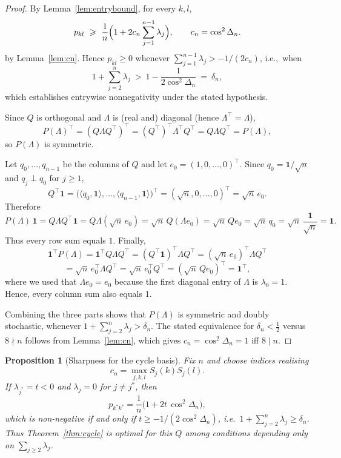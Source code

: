 \documentclass[12pt,fleqn]{amsart}
\renewcommand{\ge}{\geqslant}
\newtheorem{prop}[thm]{Proposition}
\theoremstyle{remark}
\newcommand{\1}{\mathbf{1}}
\begin{document}
\begin{proof}
By Lemma~\ref{lem:entrybound}, for every $k,l$,
\[
p_{kl}\ \ge\ \frac1n\Bigl(1+2c_n\sum_{j=1}^{n-1}\lambda_j\Bigr),
\qquad c_n=\cos^2\Delta_n.
\]
by Lemma~\ref{lem:cn}. Hence $p_{kl}\ge0$ whenever $\sum_{j=1}^{n-1}\lambda_j>-1/(2c_n)$, i.e.,\ when
\[
1+\sum_{j=2}^n\lambda_j\ >\ 1-\frac{1}{2\cos^2\Delta_n}\ =\ \delta_n,
\]
which establishes entrywise nonnegativity under the stated hypothesis.

\smallskip
Since $Q$ is orthogonal and $\Lambda$ is (real and) diagonal (hence $\Lambda^\top=\Lambda$),
\[
P(\Lambda)^\top=(Q\Lambda Q^\top)^\top=(Q^\top)^\top\Lambda^\top Q^\top=Q\Lambda Q^\top=P(\Lambda),
\]
so $P(\Lambda)$ is symmetric.

\smallskip
Let $q_0,\dots,q_{n-1}$ be the columns of $Q$ and let $e_0=(1,0,\dots,0)^\top$. Since $q_0=\1/\sqrt n$ and $q_j\perp q_0$ for $j\ge1$,
\[
Q^\top\1=\big(\langle q_0,\1\rangle,\dots,\langle q_{n-1},\1\rangle\big)^\top=(\sqrt n,0,\dots,0)^\top=\sqrt n\,e_0.
\]
Therefore
\[
P(\Lambda)\,\1
=Q\Lambda Q^\top\1
=Q\Lambda(\sqrt n\,e_0)
=\sqrt n\,Q(\Lambda e_0)
=\sqrt n\,Q e_0
=\sqrt n\,q_0
=\sqrt n\,\frac{\1}{\sqrt n}
=\1.
\]
Thus every row sum equals $1$. Finally,
\[
\1^\top P(\Lambda)
=\1^\top Q\Lambda Q^\top
=(Q^\top\1)^\top \Lambda Q^\top
=(\sqrt n\,e_0)^\top \Lambda Q^\top
\]
\[
=\sqrt n\,e_0^\top \Lambda Q^\top
=\sqrt n\,e_0^\top Q^\top
=(\sqrt n\,Q e_0)^\top
=\1^\top,
\]
where we used that $\Lambda e_0=e_0$ because the first diagonal entry of $\Lambda$ is $\lambda_0=1$. Hence, every column sum also equals $1$.

Combining the three parts shows that $P(\Lambda)$ is symmetric and doubly stochastic, whenever $1+\sum_{j=2}^n\lambda_j>\delta_n$. The stated equivalence for $\delta_n<\tfrac12$ versus $8\nmid n$ follows from Lemma~\ref{lem:cn}, which gives $c_n=\cos^2\Delta_n=1$ iff $8\mid n$.
\end{proof}


\begin{prop}[Sharpness for the cycle basis]\label{prop:sharp}
Fix $n$ and choose indices realising 
\[
    c_n=\max_{j,k,l}S_j(k)S_j(l).
\]
If $\lambda_{j^{\ast}}=t<0$ and $\lambda_j=0$ for $j\ne j^{\ast}$, then
\[
p_{k^{\ast}k^{\ast}}=\frac1n\bigl(1+2t\,\cos^2\Delta_n\bigr),
\]
which is non-negative if and only if $t\ge -1/(2\cos^2\Delta_n)$, i.e.\ $1+\sum_{j=2}^n\lambda_j\ge\delta_n$. Thus Theorem~\ref{thm:cycle} is optimal for this $Q$ among conditions depending only on $\sum_{j\ge 2}\lambda_j$.
\end{prop}
\end{document}
